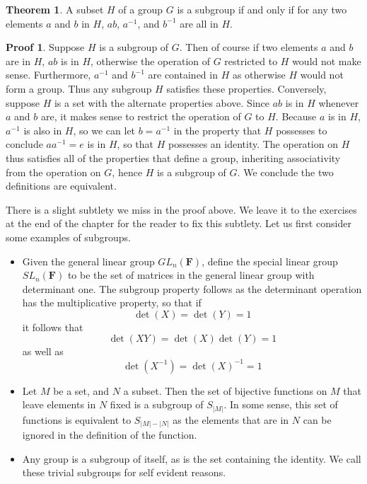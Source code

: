 \documentclass[12pt]{amsbook}
\theoremstyle{definition}
\newtheorem{theorem}{Theorem}[chapter]
\newtheorem*{prf}{Proof}
\begin{document}
\begin{theorem}
    A subset $H$ of a group $G$ is a subgroup if and only if for any two elements $a$ and $b$ in $H$, $ab$, $a^{-1}$, and $b^{-1}$ are all in $H$.
\end{theorem}
\begin{prf}
    Suppose $H$ is a subgroup of $G$. Then of course if two elements $a$ and $b$ are in $H$, $ab$ is in $H$, otherwise the operation of $G$ restricted to $H$ would not make sense. Furthermore, $a^{-1}$ and $b^{-1}$ are contained in $H$ as otherwise $H$ would not form a group. Thus any subgroup $H$ satisfies these properties. Conversely, suppose $H$ is a set with the alternate properties above. Since $ab$ is in $H$ whenever $a$ and $b$ are, it makes sense to restrict the operation of $G$ to $H$. Because $a$ is in $H$, $a^{-1}$ is also in $H$, so we can let $b = a^{-1}$ in the property that $H$ possesses to conclude $aa^{-1} = e$ is in $H$, so that $H$ possesses an identity. The operation on $H$ thus satisfies all of the properties that define a group, inheriting associativity from the operation on $G$, hence $H$ is a subgroup of $G$. We conclude the two definitions are equivalent.
\end{prf}

There is a slight subtlety we miss in the proof above. We leave it to the exercises at the end of the chapter for the reader to fix this subtlety. Let us first consider some examples of subgroups.

\begin{itemize}
    \item Given the general linear group $GL_n(\mathbf{F})$, define the special linear group $SL_n(\mathbf{F})$  to be the set of matrices in the general linear group with determinant one. The subgroup property follows as the determinant operation has the multiplicative property, so that if
    \[ \det(X) = \det(Y) = 1 \]
    it follows that
    \[ \det(XY) = \det(X)\det(Y) = 1 \]
    as well as
    \[ \det(X^{-1}) = \det(X)^{-1} = 1 \]
    \item Let $M$ be a set, and $N$ a subset. Then the set of bijective functions on $M$ that leave elements in $N$ fixed is a subgroup of $S_{|M|}$. In some sense, this set of functions is equivalent to $S_{|M| - |N|}$ as the elements that are in $N$ can be ignored in the definition of the function.
    \item Any group is a subgroup of itself, as is the set containing the identity. We call these trivial subgroups  for self evident reasons.
\end{itemize}
\end{document}
